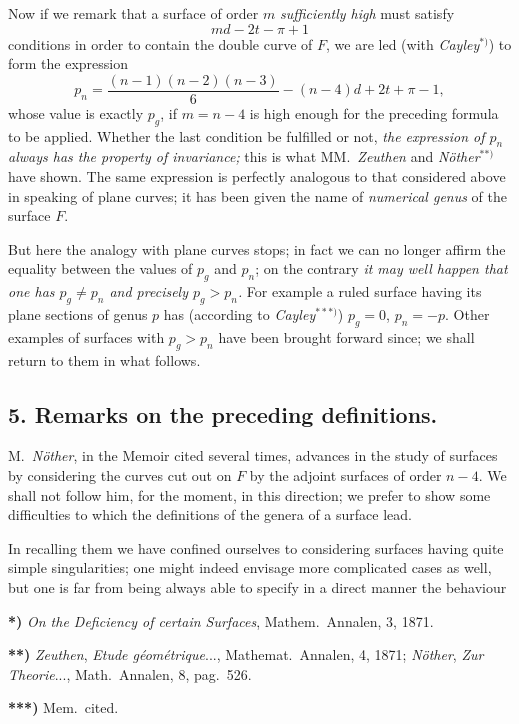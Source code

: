 \documentclass{article}
\begin{document}
Now if we remark that a surface of order $m$ \emph{sufficiently high} must satisfy
\[ md - 2t - \pi + 1 \]
conditions in order to contain the double curve of $F$, we are led (with \emph{Cayley}${}^{*)}$) to form the expression
\[ p_{n} = \frac{(n-1)(n-2)(n-3)}{6} - (n-4)d + 2t + \pi - 1, \]
whose value is exactly $p_{g}$, if $m = n - 4$ is high enough for the preceding formula to be applied. Whether the last condition be fulfilled or not, \emph{the expression of $p_{n}$ always has the property of invariance;} this is what MM.\ \emph{Zeuthen} and \emph{Nöther}${}^{**)}$ have shown. The same expression is perfectly analogous to that considered above in speaking of plane curves; it has been given the name of \emph{numerical genus} of the surface $F$.

But here the analogy with plane curves stops; in fact we can no longer affirm the equality between the values of $p_{g}$ and $p_{n}$; on the contrary \emph{it may well happen that one has $p_{g} \neq p_{n}$ and precisely $p_{g} > p_{n}$.} For example a ruled surface having its plane sections of genus $p$ has (according to \emph{Cayley}${}^{***)}$) $p_{g} = 0$, $p_{n} = -p$. Other examples of surfaces with $p_{g} > p_{n}$ have been brought forward since; we shall return to them in what follows.

\subsection*{5. Remarks on the preceding definitions.}

M.\ \emph{Nöther}, in the Memoir cited several times, advances in the study of surfaces by considering the curves cut out on $F$ by the adjoint surfaces of order $n - 4$. We shall not follow him, for the moment, in this direction; we prefer to show some difficulties to which the definitions of the genera of a surface lead.

In recalling them we have confined ourselves to considering surfaces having quite simple singularities; one might indeed envisage more complicated cases as well, but one is far from being always able to specify in a direct manner the behaviour

\textbf{*)} \emph{On the Deficiency of certain Surfaces}, Mathem.\ Annalen, 3, 1871.

\textbf{**)} \emph{Zeuthen}, \emph{Etude géométrique}..., Mathemat.\ Annalen, 4, 1871; \emph{Nöther}, \emph{Zur Theorie}..., Math.\ Annalen, 8, pag.\ 526.

\textbf{***)} Mem.\ cited.
\end{document}
